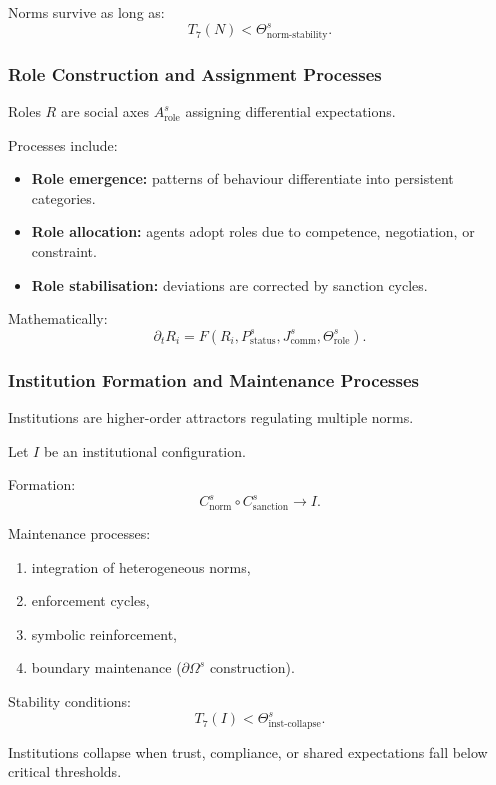 Norms survive as long as:
\[
T_7(N) < \Theta^s_{\text{norm-stability}}.
\]

\subsubsection{Role Construction and Assignment Processes}

Roles $R$ are social axes $A^s_{\text{role}}$ assigning differential 
expectations.

Processes include:
\begin{itemize}
    \item \textbf{Role emergence:}  
    patterns of behaviour differentiate into persistent categories.
    \item \textbf{Role allocation:}  
    agents adopt roles due to competence, negotiation, or constraint.
    \item \textbf{Role stabilisation:}  
    deviations are corrected by sanction cycles.
\end{itemize}

Mathematically:
\[
\partial_t R_i = F(R_i, P^s_{\text{status}}, J^s_{\text{comm}}, \Theta^s_{\text{role}}).
\]

\subsubsection{Institution Formation and Maintenance Processes}

Institutions are higher-order attractors regulating multiple norms.

Let $I$ be an institutional configuration.

Formation:
\[
C^s_{\text{norm}} \circ C^s_{\text{sanction}} \to I.
\]

Maintenance processes:
\begin{enumerate}
    \item integration of heterogeneous norms,
    \item enforcement cycles,
    \item symbolic reinforcement,
    \item boundary maintenance ($\partial\Omega^s$ construction).
\end{enumerate}

Stability conditions:
\[
T_7(I) < \Theta^s_{\text{inst-collapse}}.
\]

Institutions collapse when trust, compliance, or shared expectations 
fall below critical thresholds.

